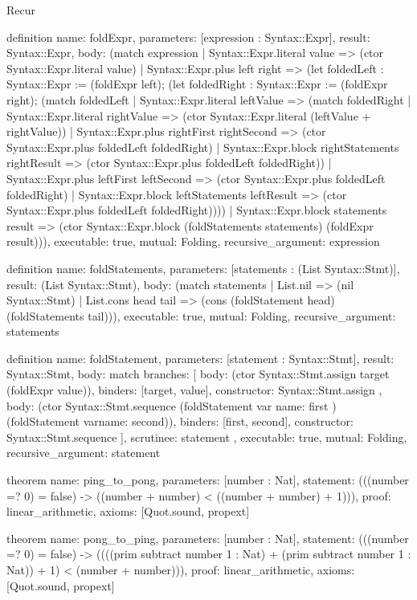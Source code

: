 \begin{lexlean}{Recur}
\begin{semanticmodule}
definition{
  name: foldExpr,
  parameters: [expression : Syntax::Expr],
  result: Syntax::Expr,
  body: (match expression
    | Syntax::Expr.literal value => (ctor Syntax::Expr.literal value)
    | Syntax::Expr.plus left right => (let foldedLeft : Syntax::Expr := (foldExpr left); (let foldedRight : Syntax::Expr := (foldExpr right); (match foldedLeft
      | Syntax::Expr.literal leftValue => (match foldedRight
        | Syntax::Expr.literal rightValue => (ctor Syntax::Expr.literal (leftValue + rightValue))
        | Syntax::Expr.plus rightFirst rightSecond => (ctor Syntax::Expr.plus foldedLeft foldedRight)
        | Syntax::Expr.block rightStatements rightResult => (ctor Syntax::Expr.plus foldedLeft foldedRight))
      | Syntax::Expr.plus leftFirst leftSecond => (ctor Syntax::Expr.plus foldedLeft foldedRight)
      | Syntax::Expr.block leftStatements leftResult => (ctor Syntax::Expr.plus foldedLeft foldedRight))))
    | Syntax::Expr.block statements result => (ctor Syntax::Expr.block (foldStatements statements) (foldExpr result))),
  executable: true,
  mutual: Folding,
  recursive_argument: expression
}

definition{
  name: foldStatements,
  parameters: [statements : (List Syntax::Stmt)],
  result: (List Syntax::Stmt),
  body: (match statements
    | List.nil => (nil Syntax::Stmt)
    | List.cons head tail => (cons (foldStatement head) (foldStatements tail))),
  executable: true,
  mutual: Folding,
  recursive_argument: statements
}

definition{
  name: foldStatement,
  parameters: [statement : Syntax::Stmt],
  result: Syntax::Stmt,
  body: match{
    branches: [
      {
        body: (ctor Syntax::Stmt.assign target (foldExpr value)),
        binders: [target, value],
        constructor: Syntax::Stmt.assign
      },
      {
        body: (ctor Syntax::Stmt.sequence (foldStatement var{
          name: first
        }) (foldStatement var{name: second})),
        binders: [first, second],
        constructor: Syntax::Stmt.sequence
      }
    ],
    scrutinee: statement
  },
  executable: true,
  mutual: Folding,
  recursive_argument: statement
}

theorem{
  name: ping_to_pong,
  parameters: [number : Nat],
  statement: (((number =? 0) = false) -> ((number + number) < ((number + number) + 1))),
  proof: linear_arithmetic{},
  axioms: [Quot.sound, propext]
}

theorem{
  name: pong_to_ping,
  parameters: [number : Nat],
  statement: (((number =? 0) = false) -> ((((prim subtract number 1 : Nat) + (prim subtract number 1 : Nat)) + 1) < (number + number))),
  proof: linear_arithmetic{},
  axioms: [Quot.sound, propext]
}


\end{semanticmodule}
\end{lexlean}
